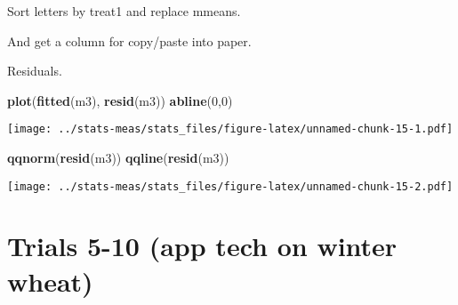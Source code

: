 \documentclass[
]{article}
\newenvironment{Shaded}{\begin{snugshade}}{\end{snugshade}}
\newcommand{\DecValTok}[1]{\textcolor[rgb]{0.00,0.00,0.81}{#1}}
\newcommand{\FunctionTok}[1]{\textcolor[rgb]{0.13,0.29,0.53}{\textbf{#1}}}
\newcommand{\NormalTok}[1]{#1}
\newcommand{\OtherTok}[1]{\textcolor[rgb]{0.56,0.35,0.01}{#1}}
\newcommand{\SpecialCharTok}[1]{\textcolor[rgb]{0.81,0.36,0.00}{\textbf{#1}}}
\newcommand{\StringTok}[1]{\textcolor[rgb]{0.31,0.60,0.02}{#1}}
\begin{document}
Sort letters by treat1 and replace mmeans.

\begin{Shaded}
\end{Shaded}

And get a column for copy/paste into paper.

\begin{Shaded}
\end{Shaded}

Residuals.

\begin{Shaded}
\begin{Highlighting}[]
\FunctionTok{plot}\NormalTok{(}\FunctionTok{fitted}\NormalTok{(m3), }\FunctionTok{resid}\NormalTok{(m3))}
\FunctionTok{abline}\NormalTok{(}\DecValTok{0}\NormalTok{,}\DecValTok{0}\NormalTok{)}
\end{Highlighting}
\end{Shaded}

\texttt{[image: ../stats-meas/stats\_files/figure-latex/unnamed-chunk-15-1.pdf]}

\begin{Shaded}
\begin{Highlighting}[]
\FunctionTok{qqnorm}\NormalTok{(}\FunctionTok{resid}\NormalTok{(m3))}
\FunctionTok{qqline}\NormalTok{(}\FunctionTok{resid}\NormalTok{(m3))}
\end{Highlighting}
\end{Shaded}

\texttt{[image: ../stats-meas/stats\_files/figure-latex/unnamed-chunk-15-2.pdf]}

\section{Trials 5-10 (app tech on winter
wheat)}\label{trials-5-10-app-tech-on-winter-wheat}
\end{document}
